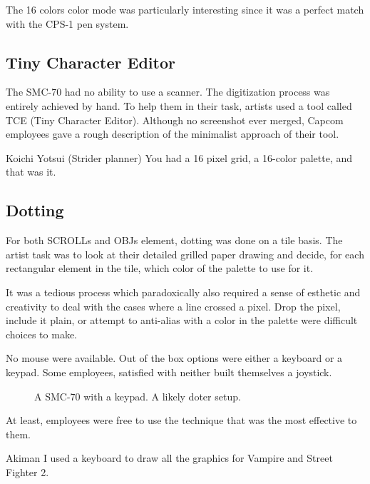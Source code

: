 The 16 colors color mode was particularly interesting since it was a perfect match with the CPS-1 pen system.


\subsection{Tiny Character Editor}

The SMC-70 had no ability to use a scanner. The digitization process was entirely achieved by hand. To help them in their task, artists used a tool called TCE (Tiny Character Editor). Although no screenshot ever merged, Capcom employees gave a rough description of the minimalist approach of their tool.

\begin{q}{Koichi Yotsui (Strider planner)}
You had a 16 pixel grid, a 16-color palette, and that was it.
\end{q}


\subsection{Dotting}
For both SCROLLs and OBJs element, dotting was done on a tile basis. The artist task was to look at their detailed grilled paper drawing and decide, for each rectangular element in the tile, which color of the palette to use for it.

It was a tedious process which paradoxically also required a sense of esthetic and creativity to deal with the cases where a line crossed a pixel. Drop the pixel, include it plain, or attempt to anti-alias with a color in the palette were difficult choices to make.


No mouse were available. Out of the box options were either a keyboard or a keypad. Some employees, satisfied with neither built themselves a joystick.


\begin{figure}[H]
\caption*{A SMC-70 with a keypad. A likely doter setup.}
\end{figure}


At least, employees were free to use the technique that was the most effective to them.

\begin{q}{Akiman\cite{akiman}}
I used a keyboard to draw all the graphics for Vampire and Street Fighter 2.
\end{q}




